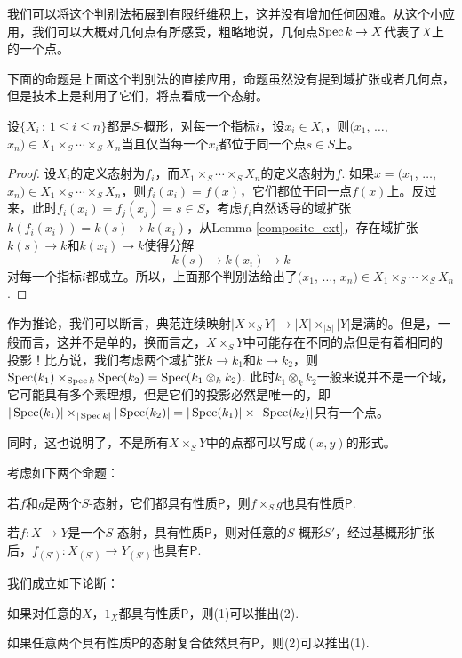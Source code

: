 我们可以将这个判别法拓展到有限纤维积上，这并没有增加任何困难。从这个小应用，我们可以大概对几何点有所感受，粗略地说，几何点$\operatorname{Spec} k\to X$代表了$X$上的一个点。

下面的命题是上面这个判别法的直接应用，命题虽然没有提到域扩张或者几何点，但是技术上是利用了它们，将点看成一个态射。

\begin{pro}\label{pro.2.12}
	设$\{X_i\,:\,1\leq i\leq n\}$都是$S$-概形，对每一个指标$i$，设$x_i\in X_i$，则$(x_1$, $\dots$, $x_n)\in X_1\times_S \cdots\times_S X_n$当且仅当每一个$x_i$都位于同一个点$s\in S$上。
\end{pro}

\begin{proof}
设$X_i$的定义态射为$f_i$，而$X_1\times_S \cdots\times_S X_n$的定义态射为$f$. 如果$x=(x_1$, $\dots$, $x_n)\in X_1\times_S \cdots\times_S X_n$，则$f_i(x_i)=f(x)$，它们都位于同一点$f(x)$上。反过来，此时$f_i(x_i)=f_j(x_j)=s\in S$，考虑$f_i$自然诱导的域扩张$k(f_i(x_i))=k(s)\to k(x_i)$，从Lemma \ref{composite_ext}，存在域扩张$k(s)\to k$和$k(x_i)\to k$使得分解
\[
	k(s)\to k(x_i)\to k
\]
对每一个指标$i$都成立。所以，上面那个判别法给出了$(x_1$, $\dots$, $x_n)\in X_1\times_S \cdots\times_S X_n$.
\end{proof}

作为推论，我们可以断言，典范连续映射$|X\times_S Y|\to |X|\times_{|S|}|Y|$是满的。但是，一般而言，这并不是单的，换而言之，$X\times_S Y$中可能存在不同的点但是有着相同的投影！比方说，我们考虑两个域扩张$k\to k_1$和$k\to k_2$，则$\operatorname{Spec}(k_1)\times_{\operatorname{Spec} k} \operatorname{Spec}(k_2)=\operatorname{Spec}(k_1\otimes_k k_2)$. 此时$k_1\otimes_k k_2$一般来说并不是一个域，它可能具有多个素理想，但是它们的投影必然是唯一的，即$|\operatorname{Spec}(k_1)|\times_{|\operatorname{Spec} k|} |\operatorname{Spec}(k_2)|=|\operatorname{Spec}(k_1)|\times |\operatorname{Spec}(k_2)|$只有一个点。

同时，这也说明了，不是所有$X\times_S Y$中的点都可以写成$(x,y)$的形式。

\begin{pro}\label{pro.2.13}
考虑如下两个命题：
\begin{compactenum}[~~~(1)]
\item 若$f$和$g$是两个$S$-态射，它们都具有性质$\mathsf{P}$，则$f\times_S g$也具有性质$\mathsf{P}$.
\item 若$f:X\to Y$是一个$S$-态射，具有性质$\mathsf{P}$，则对任意的$S$-概形$S'$，经过基概形扩张后，$f_{(S')}:X_{(S')}\to Y_{(S')}$也具有$\mathsf{P}$.
\end{compactenum}
我们成立如下论断：
\begin{compactenum}[~~(i)]
\item 如果对任意的$X$，$1_X$都具有性质$\mathsf{P}$，则(1)可以推出(2).
\item 如果任意两个具有性质$\mathsf{P}$的态射复合依然具有$\mathsf{P}$，则(2)可以推出(1).
\end{compactenum}
\end{pro}

